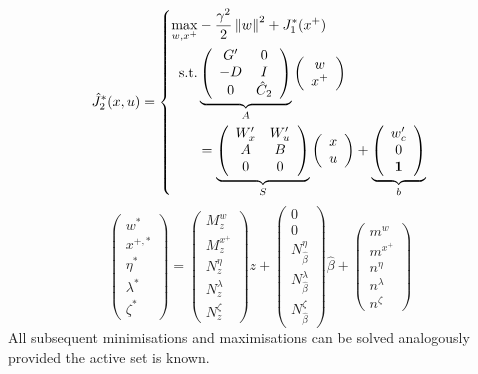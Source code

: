 \documentclass{ifacconf}
\providecommand{\norm}[1]{\left\|#1\right\|}
\begin{document}
\begin{equation}
	\hat J_2^\ast(x,u) = \left\{\begin{split}
	\max_{w,x^+} & -\frac{\gamma^2}{2}\norm{w}^2 + J_{1}^\ast(x^+)\\
	\text{s.t.} & 
	\underbrace{\left(\begin{array}{cc}
	G^\prime & 0 \\ -D & I \\
	0 & \hat C_2
	\end{array}\right)}_{\bar A}
	\left(\begin{array}{c}w\\ x^+\end{array}\right)
	\\&= \underbrace{\left(\begin{array}{cc}W_x^\prime & W_u^\prime \\ A & B \\ 0 & 0\end{array}\right)}_{
	\bar S
	}
	\left(\begin{array}{c}x \\ u \end{array}\right) + \underbrace{\left(\begin{array}{c}
	w_c^\prime \\ 0 \\ {\bf{1}}\end{array}\right)}_{\bar b}
	\end{split}\right.
\end{equation}
\begin{equation}
	\left(\begin{array}{c}
	w^\ast \\
	x^{+,\ast} \\
	\eta^\ast \\
	\lambda^\ast\\
	\zeta^\ast
	\end{array}\right) = \left(\begin{array}{c}M^w_z\\ M^{x^+}_z \\ N^{\eta}_z \\ N^{\lambda}_z \\ N^{\zeta}_z
	\end{array}\right)z + 
	\left(\begin{array}{c}0\\ 0 \\ N^{\eta}_{\hat\beta} \\ N^{\lambda}_{\hat\beta} \\ N^\zeta_{\hat\beta}
	\end{array}\right)\hat\beta + \left(\begin{array}{c}m^w\\ m^{x^+} \\ n^{\eta} \\ n^{\lambda}\\ n^\zeta
	\end{array}\right)
\end{equation}
All subsequent minimisations and maximisations can be solved analogously provided the active set is
known.
\end{document}
